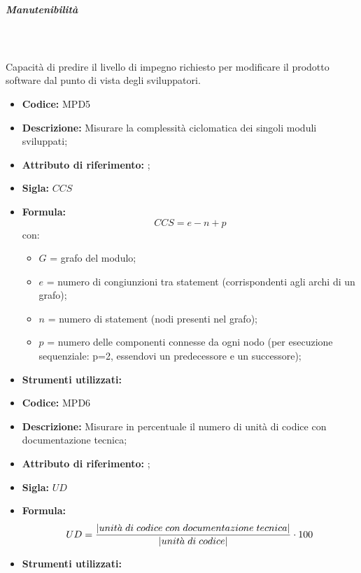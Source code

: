 \subparagraph{Manutenibilità} \mbox{}\\ \\
Capacità di predire il livello di impegno richiesto per modificare il prodotto software dal punto di vista degli sviluppatori.           
    \begin{itemize}
    \item \textbf{Codice:} MPD5
    \item \textbf{Descrizione:} Misurare la complessità ciclomatica dei singoli moduli sviluppati;
    \item \textbf{Attributo di riferimento:} ;
    \item \textbf{Sigla:} $CCS$
    \item \textbf{Formula:} $$CCS = e - n + p$$
    con:
    \begin{itemize}
        \item $G$ = grafo del modulo;
        \item $e$ = numero di congiunzioni tra statement (corrispondenti agli archi di un grafo);
        \item $n$ = numero di statement (nodi presenti nel grafo);
        \item $p$ = numero delle componenti connesse da ogni nodo (per esecuzione sequenziale: p=2, essendovi un predecessore e un successore);
    \end{itemize}

    \item \textbf{Strumenti utilizzati:}
\end{itemize}

\begin{itemize}
    \item \textbf{Codice:} MPD6
    \item \textbf{Descrizione:} Misurare in percentuale il numero di unità di codice con documentazione tecnica;
    \item \textbf{Attributo di riferimento:} ;
    \item \textbf{Sigla:} $UD$
    \item \textbf{Formula:} $$UD = {|unit\grave{a} \; di \; codice \; con \; documentazione \; tecnica| \over |unit\grave{a} \; di \; codice|} \cdot 100$$
    \item \textbf{Strumenti utilizzati:}
\end{itemize}
              
